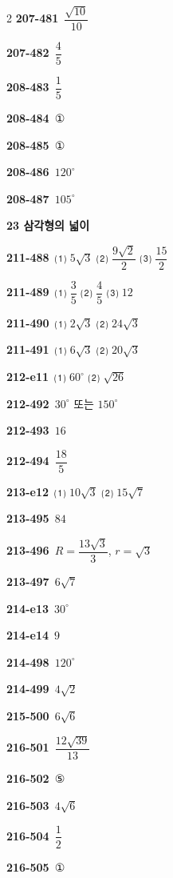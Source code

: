 \documentclass[10pt,a4paper]{article}
\begin{document}
\begin{multicols}{2}
\noindent\textbf{207-481}\ $\dfrac{\sqrt{10}}{10}$\par
\noindent\textbf{207-482}\ $\dfrac{4}{5}$\par
\noindent\textbf{208-483}\ $\dfrac{1}{5}$\par
\noindent\textbf{208-484}\ ①\par
\noindent\textbf{208-485}\ ①\par
\noindent\textbf{208-486}\ $120^\circ$\par
\noindent\textbf{208-487}\ $105^\circ$\par
\noindent\textbf{23 삼각형의 넓이}\par\smallskip
\noindent\textbf{211-488}\ ⑴ $5\sqrt{3}$ ⑵ $\dfrac{9\sqrt{2}}{2}$ ⑶ $\dfrac{15}{2}$\par
\noindent\textbf{211-489}\ ⑴ $\dfrac{3}{5}$ ⑵ $\dfrac{4}{5}$ ⑶ $12$\par
\noindent\textbf{211-490}\ ⑴ $2\sqrt{3}$ ⑵ $24\sqrt{3}$\par
\noindent\textbf{211-491}\ ⑴ $6\sqrt{3}$ ⑵ $20\sqrt{3}$\par
\noindent\textbf{212-e11}\ ⑴ $60^\circ$ ⑵ $\sqrt{26}$\par
\noindent\textbf{212-492}\ $30^\circ$ 또는 $150^\circ$\par
\noindent\textbf{212-493}\ $16$\par
\noindent\textbf{212-494}\ $\dfrac{18}{5}$\par
\noindent\textbf{213-e12}\ ⑴ $10\sqrt{3}$ ⑵ $15\sqrt{7}$\par
\noindent\textbf{213-495}\ $84$\par
\noindent\textbf{213-496}\ $R=\dfrac{13\sqrt{3}}{3}$, $r=\sqrt{3}$\par
\noindent\textbf{213-497}\ $6\sqrt{7}$\par
\noindent\textbf{214-e13}\ $30^\circ$\par
\noindent\textbf{214-e14}\ $9$\par
\noindent\textbf{214-498}\ $120^\circ$\par
\noindent\textbf{214-499}\ $4\sqrt{2}$\par
\noindent\textbf{215-500}\ $6\sqrt{6}$\par
\noindent\textbf{216-501}\ $\dfrac{12\sqrt{39}}{13}$\par
\noindent\textbf{216-502}\ ⑤\par
\noindent\textbf{216-503}\ $4\sqrt{6}$\par
\noindent\textbf{216-504}\ $\dfrac{1}{2}$\par
\noindent\textbf{216-505}\ ①\par

\end{multicols}
\end{document}
